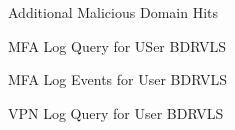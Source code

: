 \documentclass[11pt]{article}
\begin{document}
	\begin{figure}[h]
		\centering
		\caption{Additional Malicious Domain Hits}
		\label{fig: A6}
	\end{figure}
	
	\begin{figure}[h]
		\centering
		\caption{MFA Log Query for USer BDRVLS}
		\label{fig: A7}
	\end{figure}
	
	\begin{figure}[h]
		\centering
		\caption{MFA Log Events for User BDRVLS}
		\label{fig: A8}
	\end{figure}
	
	\begin{figure}[h]
		\centering
		\caption{VPN Log Query for User BDRVLS}
		\label{fig: A9}
	\end{figure}
	
\end{document}
